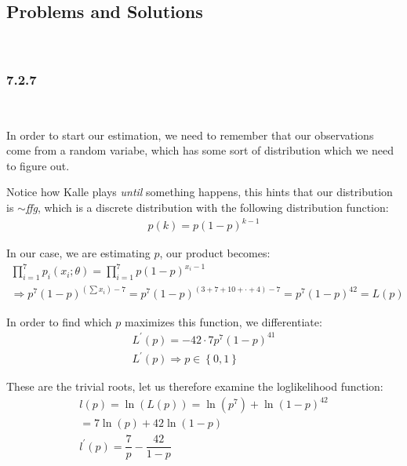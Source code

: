 \subsection{Problems and Solutions}\hfill\\\par
\subsubsection{7.2.7}\hfill\\\par
\noindent In order to start our estimation, we need to remember that our observations come from a random variabe, which has some sort of distribution which we need to figure out.\par
\noindent Notice how Kalle plays \textit{until} something happens, this hints that our distribution is $\sim$\textit{ffg}, which is a discrete distribution with the following distribution function:
\begin{equation*}
  \begin{gathered}
    p(k) = p(1-p)^{k-1}
  \end{gathered}
\end{equation*}
\par\bigskip
\noindent In our case, we are estimating $p$, our product becomes:
\begin{equation*}
  \begin{gathered}
    \prod_{i=1}^{7}p_i(x_i;\theta) = \prod_{i=1}^{7}p(1-p)^{x_i-1}\\
    \Rightarrow p^7(1-p)^{(\sum x_i)-7} = p^7(1-p)^{(3+7+10+\cdot+4)-7} = p^7(1-p)^{42} = L(p)
  \end{gathered}
\end{equation*}
\par\bigskip
\noindent In order to find which $p$ maximizes this function, we differentiate:
\begin{equation*}
  \begin{gathered}
    L^{\prime}(p) = -42\cdot7p^7(1-p)^{41}\\
  L^{\prime}(p) \Rightarrow p\in\left\{0,1\right\}
  \end{gathered}
\end{equation*}
\par\bigskip
\noindent These are the trivial roots, let us therefore examine the loglikelihood function:
\begin{equation*}
  \begin{gathered}
    l(p) = \ln{\left(L(p)\right)} = \ln{\left(p^7\right)} + \ln{\left(1-p\right)^{42}}\\
    = 7\ln{\left(p\right)}+42\ln{\left(1-p\right)}\\
    l^{\prime}(p) = \dfrac{7}{p}-\dfrac{42}{1-p}
  \end{gathered}
\end{equation*}\par

